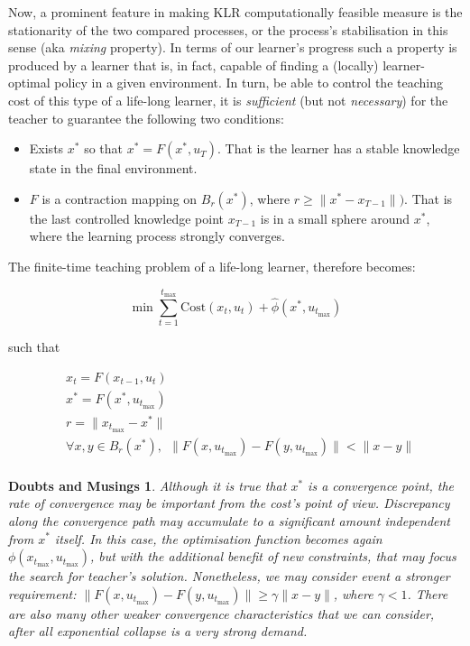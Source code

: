 \documentclass{article}
\newcommand{\ct}{\ensuremath{\mathrm{Cost}(x_t,u_t)}}
\newtheorem{doubt}{Doubts and Musings}
\begin{document}
Now, a prominent feature in making KLR computationally feasible
measure is the stationarity of the two compared processes, or the
process's stabilisation in this sense (aka {\em mixing} property). In
terms of our learner's progress such a property is produced by a
learner that is, in fact, capable of finding a (locally)
learner-optimal policy in a given environment. In turn, be able to
control the teaching cost of this type of a life-long learner, it is {\em
  sufficient} (but not {\em necessary}) for the teacher to guarantee
the following two conditions:
\begin{itemize}
\item Exists $x^*$ so that $x^*=F(x^*,u_T)$. That is the learner has a stable knowledge state in the final environment. 
\item $F$ is a contraction mapping on $B_r(x^*)$, where $r\geq\|x^*-x_{T-1}\|)$. That is the last controlled knowledge point $x_{T-1}$ is in a small sphere around $x^*$, where the learning process strongly converges. 
\end{itemize}

The finite-time teaching problem of a life-long learner, therefore becomes:

\[
\min \sum\limits_{t=1}^{t_{\max}}\ct + \widehat{\phi}(x^*, u_{t_{\max}})
\]
\centerline{such that}
\begin{eqnarray*}
&x_t=F(x_{t-1},u_t)\\
&x^*=F(x^*,u_{t_{\max}})\\
&r=\|x_{t_{\max}}-x^*\|\\
&\forall x,y\in B_r(x^*),\ \ \|F(x,u_{t_{\max}})-F(y,u_{t_{\max}})\|<\|x-y\|\\
\end{eqnarray*}

\begin{doubt}
Although it is true that $x^*$ is a convergence point, the rate of
convergence may be important from the cost's point of
view. Discrepancy along the convergence path may accumulate to a
significant amount independent from $x^*$ itself. In this case, the
optimisation function becomes again $\phi(x_{t_{\max}},
u_{t_{\max}})$, but with the additional benefit of new constraints,
that may focus the search for teacher's solution. Nonetheless, we may
consider event a stronger requirement:
$\|F(x,u_{t_{\max}})-F(y,u_{t_{\max}})\|\geq\gamma\|x-y\|$, where
$\gamma<1$. There are also many other weaker convergence
characteristics that we can consider, after all exponential collapse
is a {\em very} strong demand.
\end{doubt}
\end{document}
